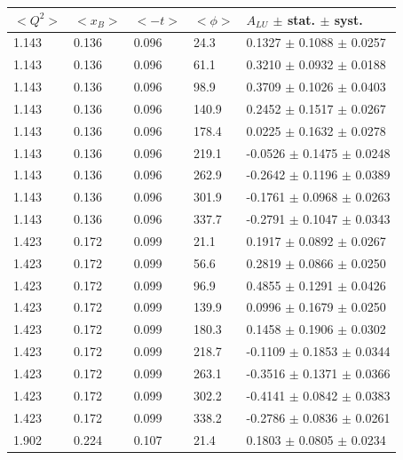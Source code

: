 \documentclass[aps,prc,preprint,superscriptaddress]{revtex4}
\begin{document}
\begin{table}[!h]
   \begin{center}
      \begin{tabular}{||l|l|l|l|l||}
         \hline
 $<Q^{2}>$ & $<x_{B}>$ & $<-t>$ & $<\phi>$ & $A_{LU}$ $\pm$ stat. $\pm$ syst.\\
         \hline
  1.143 & 0.136 & 0.096 & 24.3  &  0.1327 $\pm$ 0.1088 $\pm$ 0.0257 \\ 
  1.143 & 0.136 & 0.096 & 61.1  &  0.3210 $\pm$ 0.0932 $\pm$ 0.0188 \\ 
  1.143 & 0.136 & 0.096 & 98.9  &  0.3709 $\pm$ 0.1026 $\pm$ 0.0403 \\ 
  1.143 & 0.136 & 0.096 & 140.9 &  0.2452 $\pm$ 0.1517 $\pm$ 0.0267 \\ 
  1.143 & 0.136 & 0.096 & 178.4 &  0.0225 $\pm$ 0.1632 $\pm$ 0.0278 \\ 
  1.143 & 0.136 & 0.096 & 219.1 & -0.0526 $\pm$ 0.1475 $\pm$ 0.0248 \\ 
  1.143 & 0.136 & 0.096 & 262.9 & -0.2642 $\pm$ 0.1196 $\pm$ 0.0389 \\ 
  1.143 & 0.136 & 0.096 & 301.9 & -0.1761 $\pm$ 0.0968 $\pm$ 0.0263 \\ 
  1.143 & 0.136 & 0.096 & 337.7 & -0.2791 $\pm$ 0.1047 $\pm$ 0.0343 \\ 
  \hline                                                                                                           
  1.423 & 0.172 & 0.099 & 21.1  &  0.1917 $\pm$ 0.0892 $\pm$ 0.0267 \\ 
  1.423 & 0.172 & 0.099 & 56.6  &  0.2819 $\pm$ 0.0866 $\pm$ 0.0250 \\ 
  1.423 & 0.172 & 0.099 & 96.9  &  0.4855 $\pm$ 0.1291 $\pm$ 0.0426 \\ 
  1.423 & 0.172 & 0.099 & 139.9 &  0.0996 $\pm$ 0.1679 $\pm$ 0.0250 \\ 
  1.423 & 0.172 & 0.099 & 180.3 &  0.1458 $\pm$ 0.1906 $\pm$ 0.0302 \\ 
  1.423 & 0.172 & 0.099 & 218.7 & -0.1109 $\pm$ 0.1853 $\pm$ 0.0344 \\ 
  1.423 & 0.172 & 0.099 & 263.1 & -0.3516 $\pm$ 0.1371 $\pm$ 0.0366 \\ 
  1.423 & 0.172 & 0.099 & 302.2 & -0.4141 $\pm$ 0.0842 $\pm$ 0.0383 \\ 
  1.423 & 0.172 & 0.099 & 338.2 & -0.2786 $\pm$ 0.0836 $\pm$ 0.0261 \\ 
  \hline                                                                                                           
  1.902 & 0.224 & 0.107 & 21.4  &  0.1803 $\pm$ 0.0805 $\pm$ 0.0234 \\ 

\end{tabular}
\end{center}
\end{table}
\end{document}
